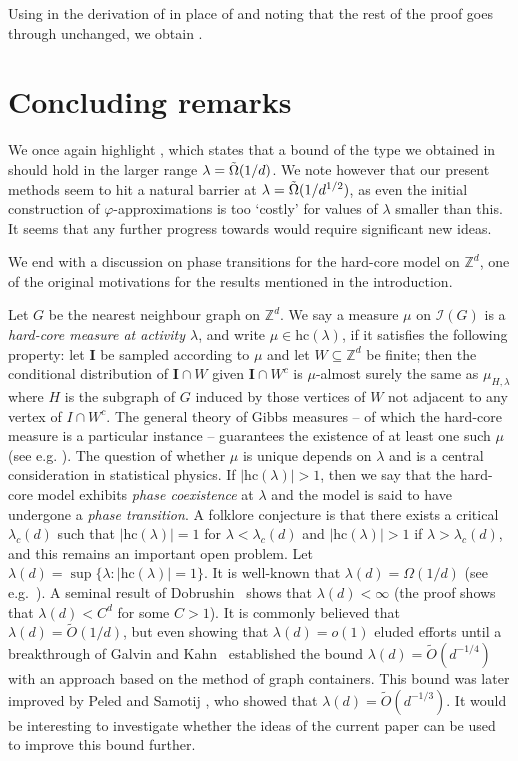 \documentclass[10pt,a4paper]{amsart}
\theoremstyle{definition}
\newcommand{\Z}{\mathbb{Z}}
\newcommand{\0}[0]{\emptyset}
\newcommand{\lam}{\lambda}
\begin{document}
Using  in the derivation of \cite[Theorem 2]{jenssen2023approximately} in place of \cite[Lemma 20]{jenssen2023approximately} and noting that the rest of the proof goes through unchanged, we obtain .

\section{Concluding remarks}\label{conclusion}
We once again highlight  , which states that a bound of the type we obtained in  should hold in the larger range $\lam=\Tilde{\Omega}(1/d)$. We note however that our present methods seem to hit a natural barrier at $\lam=\Tilde{\Omega}(1/d^{1/2})$, as even the initial construction of $\varphi$-approximations is too `costly' for values of $\lam$ smaller than this. It seems that any further progress towards  would require significant new ideas.

We end with a discussion on phase transitions for the hard-core model on $\Z^d$, one of the original motivations for the results mentioned in the introduction. 

Let $G$ be the nearest neighbour graph on $\mathbb Z^d$. We say a measure $\mu$ on $\mathcal{I}(G)$ is a \emph{hard-core measure at activity $\lam$}, and write $\mu\in \text{hc}(\lam)$, if it satisfies the following property: let $\mathbf I$ be sampled according to $\mu$ and let $W\subseteq \mathbb{Z}^d$ be finite; then the conditional distribution of $\mathbf I \cap W$ given $\mathbf I \cap W^c$ is $\mu$-almost surely the same as $\mu_{H,\lam}$ where $H$ is the subgraph of $G$ induced by those vertices of $W$ not adjacent to any vertex of $I \cap W^c$. The general theory of Gibbs measures -- of which the hard-core measure is a particular instance -- guarantees the existence of at least one such $\mu$ (see e.g. \cite{georgii2011gibbs}). The question of whether $\mu$ is unique depends on $\lambda$ and is a central consideration in statistical physics. If $|\text{hc}(\lam)|>1$, then we say that the hard-core model exhibits \emph{phase coexistence} at $\lambda$ and the model is said to have undergone a \emph{phase transition}. A folklore conjecture is that there exists a critical $\lam_c(d)$ such that $|\text{hc}(\lam)|=1$ for $\lam<\lam_c(d)$ and $|\text{hc}(\lam)|>1$ if $\lam>\lam_c(d)$, and this remains an important open problem. Let $\lam(d)=\sup\{\lam: |\text{hc}(\lam)|=1 \}$. It is well-known that $\lam(d)=\Omega(1/d)$ (see e.g.~\cite{vdBS}). A seminal result of Dobrushin~\cite{dobrushinhardcore} shows that $\lam(d)<\infty$ (the proof shows that $\lam(d)<C^d$ for some $C>1$). It is commonly believed that $\lam(d)=\tilde O(1/d)$, but even showing that $\lam(d)=o(1)$ eluded efforts until a breakthrough of Galvin and Kahn~\cite{GalK04} established the bound $\lam(d)=\tilde O(d^{-1/4})$ with an approach based on the method of graph containers. This bound was later improved by Peled and Samotij \cite{peledsamotij}, who showed that $\lam(d)=\tilde O(d^{-1/3})$. It would be interesting to investigate whether the ideas of the current paper can be used to improve this bound further. 
\end{document}
